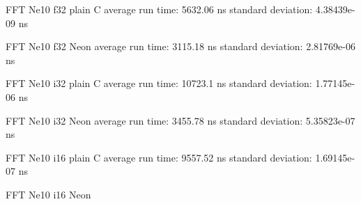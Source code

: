 \documentclass{article}
\begin{document}
    FFT Ne10 f32 plain C
    average run time:   5632.06 ns
    standard deviation: 4.38439e-09 ns

    FFT Ne10 f32 Neon
    average run time:   3115.18 ns
    standard deviation: 2.81769e-06 ns

    FFT Ne10 i32 plain C
    average run time:   10723.1 ns
    standard deviation: 1.77145e-06 ns

    FFT Ne10 i32 Neon
    average run time:   3455.78 ns
    standard deviation: 5.35823e-07 ns

    FFT Ne10 i16 plain C
    average run time:   9557.52 ns
    standard deviation: 1.69145e-07 ns

    FFT Ne10 i16 Neon
% 
% 
%     
%     
%     
%     
%     
%     
% 
\end{document}
